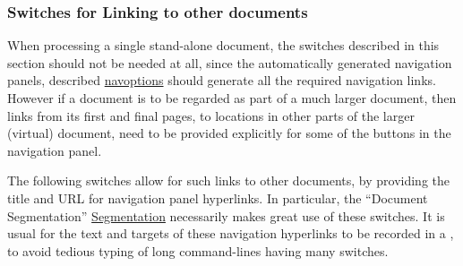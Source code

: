 \subsubsection{Switches for Linking to other documents\label{otherdocs}}
%
When processing a single stand-alone document, the switches described in this
section should not be needed at all, since the automatically generated navigation panels,
described \hyperref{on the previous page}{in Section~}{, }{navoptions}
should generate all the required navigation links.
However if a document is to be regarded as part of a much larger document,
then links from its first and final pages, to locations in other parts
of the larger (virtual) document,
need to be provided explicitly for some of the buttons in the navigation panel.

The following switches allow for such links to other documents,
by providing the title and URL for navigation panel hyperlinks.
In particular, the ``Document Segmentation''
\hyperref{feature}{feature of Section~}{}{Segmentation}
necessarily makes great use of these switches.
It is usual for the text and targets of these navigation hyperlinks
to be recorded in a ,
to avoid tedious typing of long command-lines having many switches.

